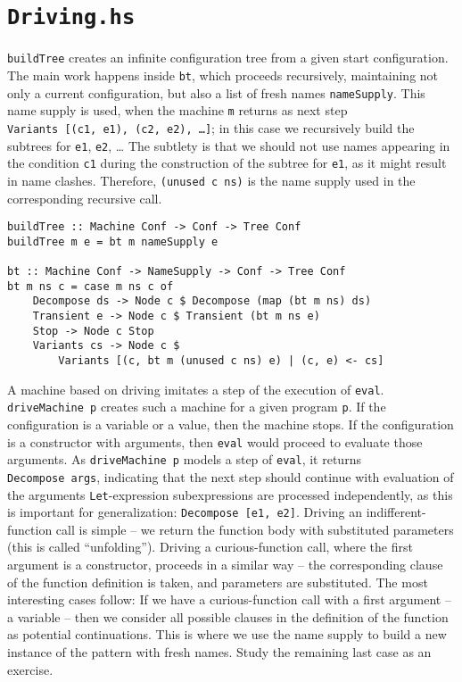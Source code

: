 \section{\texttt{Driving.hs}}

\texttt{buildTree} creates an infinite configuration tree from a given start configuration.
The main work happens inside \texttt{bt}, which proceeds recursively,
maintaining not only a current configuration, but also a list of fresh names \texttt{nameSupply}.
This name supply is used, when the machine \texttt{m} returns as next step
\texttt{Variants~[(c1,~e1),~(c2, e2),~\ldots]};
in this case we recursively build the subtrees for \texttt{e1}, \texttt{e2}, \ldots
The subtlety is that we should not use names appearing in the condition \texttt{c1}
during the construction of the subtree for \texttt{e1},
as it might result in name clashes.
Therefore, \texttt{(unused c ns)} is the name supply used in the corresponding recursive call.
\begin{lstlisting}[name=driving]
buildTree :: Machine Conf -> Conf -> Tree Conf
buildTree m e = bt m nameSupply e

bt :: Machine Conf -> NameSupply -> Conf -> Tree Conf
bt m ns c = case m ns c of
	Decompose ds -> Node c $ Decompose (map (bt m ns) ds)
	Transient e -> Node c $ Transient (bt m ns e)
	Stop -> Node c Stop
	Variants cs -> Node c $ 
		Variants [(c, bt m (unused c ns) e) | (c, e) <- cs]
\end{lstlisting}
A machine based on driving imitates a step of the execution of \texttt{eval}. 
\texttt{driveMachine~p} creates such a machine for a given program \texttt{p}.
If the configuration is a variable or a value, then the machine stops.
If the configuration is a constructor with arguments, then \texttt{eval}
would proceed to evaluate those arguments.
As \texttt{driveMachine~p} models a step of \texttt{eval},
it returns \texttt{Decompose~args},
indicating that the next step should continue with evaluation of the arguments
\texttt{Let}-expression subexpressions are processed independently, as 
this is important for generalization: \texttt{Decompose~[e1,~e2]}.
Driving an indifferent-function call is simple -- we return the function body
with substituted parameters (this is called ``unfolding'').
Driving a curious-function call, where the first argument is a constructor,
proceeds in a similar way -- the corresponding clause of the
function definition is taken, and parameters are substituted.
The most interesting cases follow:
If we have a curious-function call with a first argument -- a variable --
then we consider all possible clauses in the definition of the function
as potential continuations. This is where we use the name supply to 
build a new instance of the pattern with fresh names.
Study the remaining last case as an exercise.

